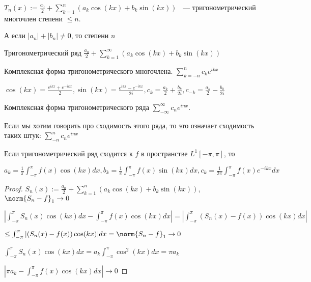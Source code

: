 \begin{definition}
    $T_n(x):= \frac{a_0}{2} + \sum_{k = 1}^n(a_k \cos(kx) + b_k\sin(kx))$ ~--- тригонометрический
    многочлен степени $\le n$.

    А если $|a_n| + |b_n| \neq 0$, то степени $n$
\end{definition}

\begin{definition}
    Тригонометрический ряд $\frac{a_0}{2} + \sum_{k = 1}^\infty(a_k \cos(kx) + b_k\sin(kx))$
\end{definition}

\begin{definition}
    Комплексная форма тригонометрического многочлена. $\sum_{k= -n}^n c_ke^{ikx}$

    $\cos(kx) = \frac{e^{ikx} + e^{-ikx}}{2}, \sin(kx) = \frac{e^{ikx} - e^{-ikx}}{2i},
        c_k = \frac{a_k}{2} + \frac{b_k}{2i}, c_{-k} =  \frac{a_k}{2} - \frac{b_k}{2i}$

    Комплексная форма тригонометрического ряда $\sum_{-\infty}^\infty c_n e^{inx}$.

    Если мы хотим говорить про сходимость этого ряда, то это означает сходимость
    таких штук: $\sum_{-n}^n c_n e^{inx}$
\end{definition}

\begin{lemma}
    Если тригонометрический ряд сходится к $f$ в пространстве $L^1[-\pi, \pi]$, то

    $a_k = \frac{1}{\pi}\int_{-\pi}^\pi f(x)\cos(kx)dx, b_k = \frac{1}{\pi}\int_{-\pi}^\pi f(x)\sin(kx)dx,
        c_k = \frac{1}{2\pi}\int_{-\pi}^\pi f(x)e^{-ikx}dx$
\end{lemma}

\begin{proof}
    $S_n(x):= \frac{a_0}{2} + \sum_{k = 1}^n(a_k \cos(kx) + b_k \sin(kx))$,
    $\norm{S_n - f}_1\rightarrow 0$

    $|\int_{-\pi}^\pi S_n(x)\cos(kx)dx - \int_{-\pi}^\pi f(x)\cos(kx)dx| = |\int_{-\pi}^\pi (S_n(x) - f(x))\cos(kx)dx|$

    $\le \int_{-\pi}^\pi |(S_n(x) - f(x))\cos(kx)|dx = \norm{S_n - f}_1\rightarrow0$

    $\int_{-\pi}^\pi S_n(x)\cos(kx)dx = a_k \int_{-\pi}^\pi \cos^2(kx)dx = \pi a_k$

    $|\pi a_k - \int_{-\pi}^\pi f(x)\cos(kx)dx| \rightarrow 0$

\end{proof}

